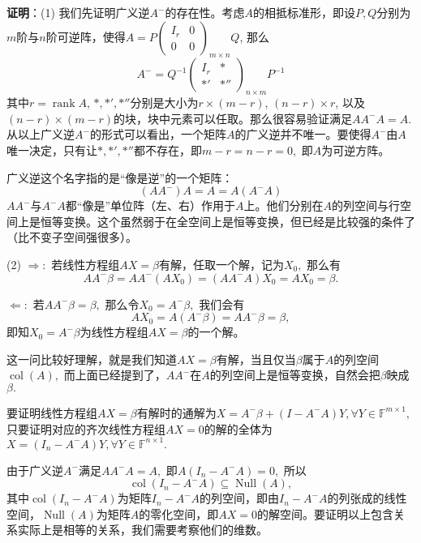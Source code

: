 \ifIncludeAnswer

\newpageorvspace

\textbf{证明}：(1) 我们先证明广义逆$A^-$的存在性。考虑$A$的相抵标准形，即设$P,Q$分别为$m$阶与$n$阶可逆阵，使得$A = P \begin{pmatrix} I_r & 0 \\ 0 & 0 \end{pmatrix}_{m\times n}\!\!\!\!\!\!\!\!\!\!\! Q$, 那么
$$A^- = Q^{-1} \begin{pmatrix} I_r & * \\ *' & *'' \end{pmatrix}_{n\times m}\!\!\!\!\!\!\!\!\!\!\! P^{-1}$$
其中$r = \operatorname{rank} A$, $*,*',*''$分别是大小为$r \times (m-r)$, $(n-r) \times r$, 以及$(n-r) \times (m-r)$的块，块中元素可以任取。那么很容易验证满足$AA^-A = A.$ 从以上广义逆$A^-$的形式可以看出，一个矩阵$A$的广义逆并不唯一。要使得$A^-$由$A$唯一决定，只有让$*,*',*''$都不存在，即$m - r = n - r = 0,$ 即$A$为可逆方阵。

\vspace{0.5em}

广义逆这个名字指的是``像是逆''的一个矩阵：
$$(AA^-)A = A = A(A^-A)$$
$AA^-$与$A^-A$都``像是''单位阵（左、右）作用于$A$上。他们分别在$A$的列空间与行空间上是恒等变换。这个虽然弱于在全空间上是恒等变换，但已经是比较强的条件了（比不变子空间强很多）。

\vspace{0.5em}

(2) $\Rightarrow:$ 若线性方程组$AX = \beta$有解，任取一个解，记为$X_0,$ 那么有
$$AA^-\beta = AA^-(AX_0) = (AA^-A)X_0 = AX_0 = \beta.$$

$\Leftarrow:$ 若$AA^-\beta = \beta,$ 那么令$X_0 = A^-\beta,$ 我们会有
$$AX_0 = A(A^-\beta) = AA^-\beta = \beta,$$
即知$X_0 = A^-\beta$为线性方程组$AX = \beta$的一个解。

这一问比较好理解，就是我们知道$AX = \beta$有解，当且仅当$\beta$属于$A$的列空间$\operatorname{col}(A),$ 而上面已经提到了，$AA^-$在$A$的列空间上是恒等变换，自然会把$\beta$映成$\beta.$

要证明线性方程组$AX = \beta$有解时的通解为$X = A^-\beta + (I - A^-A)Y, \forall Y \in \mathbb{F}^{m\times 1},$ 只要证明对应的齐次线性方程组$AX = 0$的解的全体为$X = (I_n - A^-A)Y, \forall Y \in \mathbb{F}^{n\times 1}.$

由于广义逆$A^-$满足$AA^-A = A,$ 即$A(I_n - A^-A) = 0,$ 所以
$$\operatorname{col}(I_n - A^-A) \subseteq \operatorname{Null} (A),$$
其中$\operatorname{col}(I_n - A^-A)$为矩阵$I_n - A^-A$的列空间，即由$I_n - A^-A$的列张成的线性空间，$\operatorname{Null} (A)$为矩阵$A$的零化空间，即$AX = 0$的解空间。要证明以上包含关系实际上是相等的关系，我们需要考察他们的维数。

